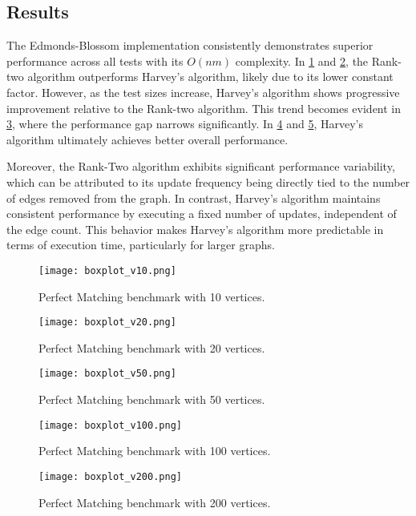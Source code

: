 \subsection{Results}
The Edmonds-Blossom implementation consistently demonstrates superior performance across all tests with its \(O(nm)\) complexity. 
In \cref{fig:v10} and \cref{fig:v20}, the Rank-two algorithm outperforms Harvey's algorithm, likely due to its lower constant factor. 
However, as the test sizes increase, Harvey's algorithm shows progressive improvement relative to the Rank-two algorithm. 
This trend becomes evident in \cref{fig:v50}, where the performance gap narrows significantly. 
In \cref{fig:v100} and \cref{fig:v200}, Harvey's algorithm ultimately achieves better overall performance.

Moreover, the Rank-Two algorithm exhibits significant performance variability, which can be attributed to its update frequency being directly tied to the number of edges removed from the graph. 
In contrast, Harvey's algorithm maintains consistent performance by executing a fixed number of updates, independent of the edge count. 
This behavior makes Harvey's algorithm more predictable in terms of execution time, particularly for larger graphs.

\begin{figure}[H]
  \centering
  \texttt{[image: boxplot\_v10.png]}
  \caption{Perfect Matching benchmark with 10 vertices.}
  \label{fig:v10}
\end{figure}
\begin{figure}[H]
  \centering
  \texttt{[image: boxplot\_v20.png]}
  \caption{Perfect Matching benchmark with 20 vertices.}
  \label{fig:v20}
\end{figure}
\begin{figure}[H]
  \centering
  \texttt{[image: boxplot\_v50.png]}
  \caption{Perfect Matching benchmark with 50 vertices.}
  \label{fig:v50}
\end{figure}
\begin{figure}[H]
  \centering
  \texttt{[image: boxplot\_v100.png]}
  \caption{Perfect Matching benchmark with 100 vertices.}
  \label{fig:v100}
\end{figure}
\begin{figure}[H]
  \centering
  \texttt{[image: boxplot\_v200.png]}
  \caption{Perfect Matching benchmark with 200 vertices.}
  \label{fig:v200}
\end{figure}
